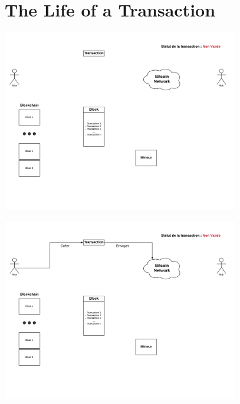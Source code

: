 \documentclass{beamer}
\begin{document}
\section{The Life of a Transaction}

\begin{frame}
    \begin{center}
        \includegraphics[height=8cm]{images/explanation-0.png}
    \end{center}
\end{frame}

\begin{frame}
    \begin{center}
        \includegraphics[height=8cm]{images/explanation-2.png}
    \end{center}
\end{frame}
\end{document}
